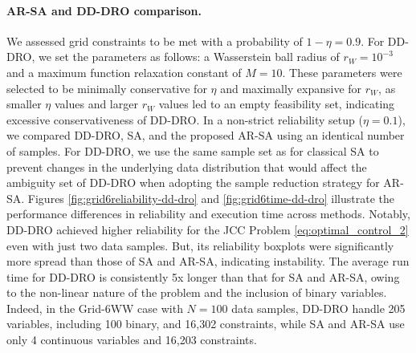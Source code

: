 \paragraph{AR-SA and DD-DRO comparison.}
We assessed grid constraints to be met with a probability of $1-\eta = 0.9$. For DD-DRO, we set the parameters as follows: a Wasserstein ball radius of $r_W = 10^{-3}$ and a maximum function relaxation constant of $M = 10$. These parameters were selected to be minimally conservative for $\eta$ and maximally expansive for $r_W$, as smaller $\eta$ values and larger $r_W$ values led to an empty feasibility set, indicating excessive conservativeness of DD-DRO. In a non-strict reliability setup ($\eta=0.1$), we compared DD-DRO, SA, and the proposed AR-SA using an identical number of samples. For DD-DRO, we use the same sample set as for classical SA to prevent changes in the underlying data distribution that would affect the ambiguity set of DD-DRO when adopting the sample reduction strategy for AR-SA. Figures \ref{fig:grid6reliability-dd-dro} and \ref{fig:grid6time-dd-dro} illustrate the performance differences in reliability and execution time across methods. Notably, DD-DRO achieved higher reliability for the JCC Problem \eqref{eq:optimal_control_2} even with just two data samples. But, its reliability boxplots were significantly more spread than those of SA and AR-SA, indicating instability. The average run time for DD-DRO is consistently 5x longer than that for SA and AR-SA, owing to the non-linear nature of the problem and the inclusion of binary variables. Indeed, in the Grid-6WW case with $N=100$ data samples, DD-DRO handle 205 variables, including 100 binary, and 16,302 constraints, while SA and AR-SA use only 4 continuous variables and 16,203 constraints.
